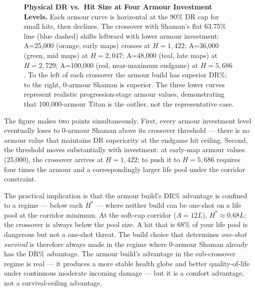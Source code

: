 \documentclass[12pt, letterpaper]{article}
\begin{document}
\begin{figure}[htbp]
\caption{\textbf{Physical DR vs.\ Hit Size at Four Armour Investment Levels.} Each armour curve is horizontal at the 90\% DR cap for small hits, then declines. The crossover with Shaman's flat 63.75\% line (blue dashed) shifts leftward with lower armour investment: A=25{,}000 (orange, early maps) crosses at $H=1{,}422$; A=36{,}000 (green, mid maps) at $H=2{,}047$; A=48{,}000 (teal, late maps) at $H=2{,}729$; A=100{,}000 (red, near-maximum endgame) at $H=5{,}686$. To the left of each crossover the armour build has superior DR\%; to the right, 0-armour Shaman is superior. The three lower curves represent realistic progression-stage armour values, demonstrating that 100{,}000-armour Titan is the outlier, not the representative case.}
\label{fig:crossover_spectrum}
\end{figure}

The figure makes two points simultaneously. First, every armour investment level eventually loses to 0-armour Shaman above its crossover threshold --- there is no armour value that maintains DR superiority at the endgame hit ceiling. Second, the threshold moves substantially with investment: at early-map armour values (25{,}000), the crossover arrives at $H = 1{,}422$; to push it to $H = 5{,}686$ requires four times the armour and a correspondingly larger life pool under the corridor constraint.

The practical implication is that the armour build's DR\% advantage is confined to a regime --- below each $H^*$ --- where neither build can be one-shot on a life pool at the corridor minimum. At the soft-cap corridor ($A = 12L$), $H^* \approx 0.68L$: the crossover is always below the pool size. A hit that is 68\% of your life pool is dangerous but not a one-shot threat. The build choice that determines \textit{one-shot survival} is therefore always made in the regime where 0-armour Shaman already has the DR\% advantage. The armour build's advantage in the sub-crossover regime is real --- it produces a more stable health globe and better quality-of-life under continuous moderate incoming damage --- but it is a comfort advantage, not a survival-ceiling advantage.
\end{document}
